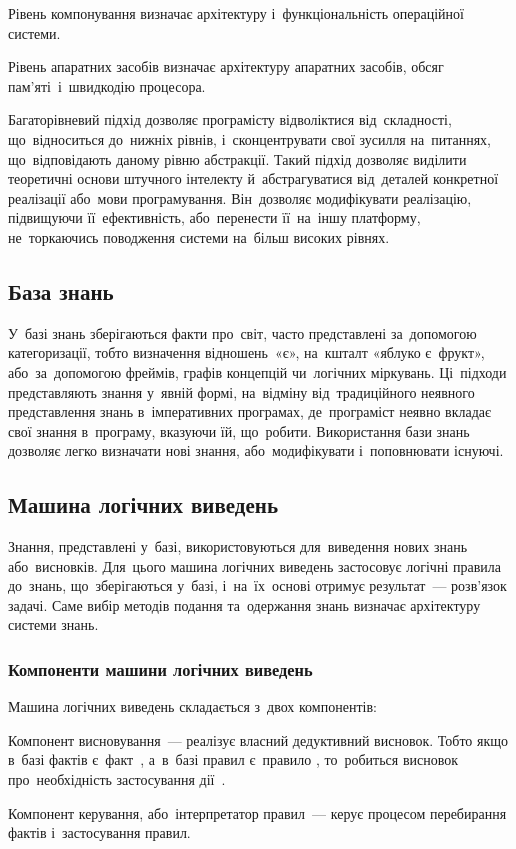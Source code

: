 \documentclass[
  a4paper,
  oneside,
  BCOR = 10mm,
  DIV = 12,
  12pt,
  headings = normal,
]{scrartcl}
\begin{document}
      Рівень компонування визначає архітектуру і~функціональність операційної системи.

      Рівень апаратних засобів визначає архітектуру апаратних засобів, обсяг пам'яті~і~швидкодію процесора.

      Багаторівневий підхід дозволяє програмісту відволіктися від~складності, що~відноситься до~нижніх рівнів, і~сконцентрувати свої зусилля на~питаннях, що~відповідають даному рівню абстракції. Такий підхід дозволяє виділити теоретичні основи штучного інтелекту й~абстрагуватися від~деталей конкретної реалізації або~мови програмування. Він~дозволяє модифікувати реалізацію, підвищуючи її~ефективність, або~перенести її~на~іншу платформу, не~торкаючись поводження системи на~більш високих рівнях.

    \subsection{База знань}
      У~базі знань зберігаються факти про~світ, часто представлені за~допомогою категоризації, тобто визначення відношень~«є», на~кшталт «яблуко є~фрукт», або~за~допомогою фреймів, графів концепцій чи~логічних міркувань. Ці~підходи представляють знання у~явній формі, на~відміну від~традиційного неявного представлення знань в~імперативних програмах, де~програміст неявно вкладає свої знання в~програму, вказуючи їй, що~робити. Використання бази знань дозволяє легко визначати нові знання, або~модифікувати і~поповнювати існуючі.

    \subsection{Машина логічних виведень}
      Знання, представлені у~базі, використовуються для~виведення нових знань або~висновків. Для~цього машина логічних виведень застосовує логічні правила до~знань, що~зберігаються у~базі, і~на~їх~основі отримує результат~— розв'язок задачі. Саме вибір методів подання та~одержання знань визначає архітектуру системи знань.

      \subsubsection{Компоненти машини логічних виведень}
        Машина логічних виведень складається з~двох компонентів:
        \begin{hangenumerate}
          \item Компонент висновування~— реалізує власний дедуктивний висновок. Тобто якщо в~базі фактів є~факт~, а~в~базі правил є~правило , то~робиться висновок про~необхідність застосування дії~.
          \item Компонент керування, або~інтерпретатор правил~— керує процесом перебирання фактів і~застосування правил.
        \end{hangenumerate}
\end{document}
